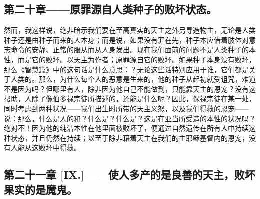 \subsection{第二十章——原罪源自人类种子的败坏状态。}

然而，我这样说，绝非暗示我们要在至高真实的天主之外另寻造物主，无论是人类种子还是由种子而来的人本身；而是说，如果没有罪在先，种子本应借着肢体对意志命令的安静、正常的服从而从人身发出。现在我们面前的问题不是人类种子的本性，而是它的败坏。以天主为作者；原罪源自它的败坏。如果种子本身没有败坏，那么《智慧篇》中的这句话是什么意思：？无论这些话特别应用于谁，它们都是关于人类的。那么，为什么每个人的恶意是生来的，他的种子从起初就受诅咒，难道不是因为吗？但哪里有人，除非因为他自己不能做到，只能靠天主的恩宠？没有这帮助，人除了像伯多禄宗徒所描述的，还能是什么呢？因此，保禄宗徒在某一处，同时考虑到两种状况——我们出生时所带的天主义怒，以及我们得救的恩宠——说：那么，什么是人的和？什么是？什么是？这是在亚当所受造的本性的状况吗？绝对不！因为他的纯洁本性在他里面被败坏了，便通过自然遗传在所有人中持续这种状态，并且仍然在持续；以至于除非藉着天主在我们的主耶稣基督内的恩宠，没有人能从这败坏中得救。\par


\subsection{第二十一章 [IX.]——使人多产的是良善的天主，败坏果实的是魔鬼。}

